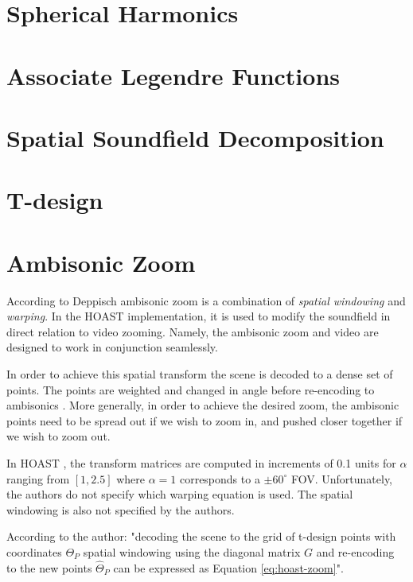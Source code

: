 \section{Spherical Harmonics}

\section{Associate Legendre Functions}

\section{Spatial Soundfield Decomposition}

\section{T-design}

\section{Ambisonic Zoom} \label{sec:ambi-zoom}

According to Deppisch \cite{deppisch2020hoast} ambisonic zoom is a combination of \textit{spatial windowing} and \textit{warping}. In the HOAST implementation, it is used to modify the soundfield in direct relation to video zooming. Namely, the ambisonic zoom and video are designed to work in conjunction seamlessly. 

In order to achieve this spatial transform the scene is decoded to a dense set of points. The points are weighted and changed in angle before re-encoding to ambisonics \cite{kronlachner2014plug}. More generally, in order to achieve the desired zoom, the ambisonic points need to be spread out if we wish to zoom in, and pushed closer together if we wish to zoom out. 

In HOAST \cite{deppisch2020hoast}, the transform matrices are computed in increments of 0.1 units for $\alpha$ ranging from 
$[1,2.5]$ where $\alpha = 1$ corresponds to a $ \pm 60^{\circ} $ FOV. Unfortunately, the authors do not specify which warping equation is used. The spatial windowing is also not specified by the authors. 

According to the author: "decoding the scene to the grid of t-design points with coordinates $\Theta_{P}$ spatial windowing using the diagonal matrix $G$ and re-encoding to the new points $\hat{\Theta}_{P}$ can be expressed as Equation \ref{eq:hoast-zoom}". 

